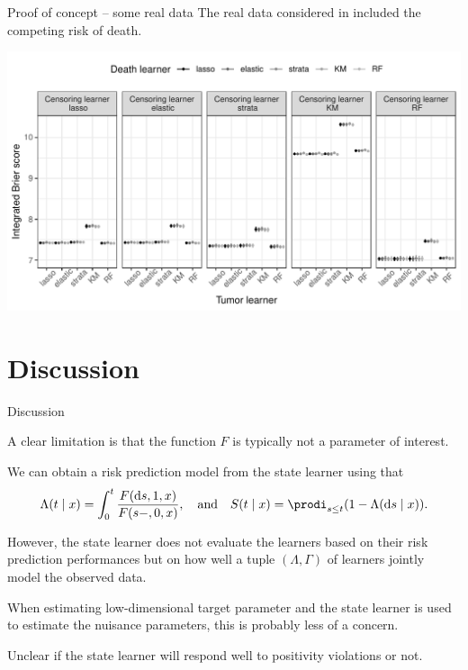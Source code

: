 \documentclass[smaller]{beamer}\usepackage{listings}
\begin{document}
\begin{frame}[label={sec:org611f31a}]{Proof of concept -- some real data}
\small The real data considered in \citep{kattan2000pretreatment} included the
competing risk of death.

\begin{center}
\includegraphics[width=1\textwidth]{./zelefski-real-data.pdf}
\end{center}
\end{frame}

\section{Discussion}
\label{sec:orgc46137f}
\begin{frame}[label={sec:org169996b}]{Discussion}
\small

A clear limitation is that the function \(F\) is typically not a parameter of
interest.

\vfill

We can obtain a risk prediction model from the state learner using that
\begin{equation*}
  \Lambda(t \mid x) = \int_0^t \frac{F(\diff s, 1, x)}{F(s-, 0, x)} ,
  \quad \text{and} \quad
  S(t \mid x)
  = \prodi_{s \leq t}(1- \Lambda(\diff s \mid x)).
\end{equation*}

However, the state learner does not evaluate the learners based on their risk
prediction performances but on how well a tuple \((\Lambda, \Gamma)\) of
learners jointly model the observed data.

\vfill

When estimating low-dimensional target parameter and the state learner is used
to estimate the nuisance parameters, this is probably less of a concern.

\vfill

Unclear if the state learner will respond well to positivity violations or not.
\end{frame}
\end{document}
